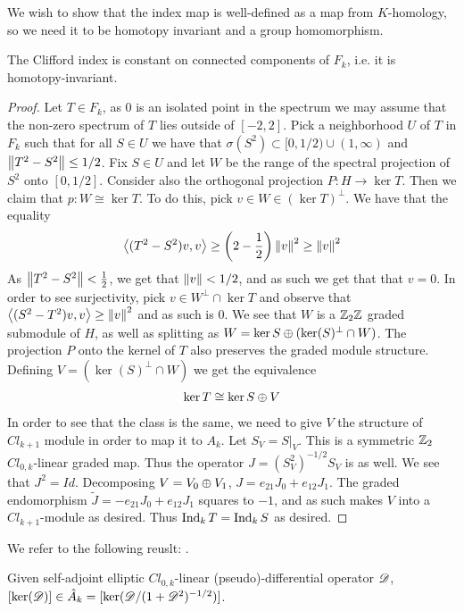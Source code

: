 We wish to show that the index map is well-defined as a map from $K$-homology, so we need it to be homotopy invariant and a group homomorphism. 
\begin{theorem}\label{welldef}
	The Clifford index is constant on connected components of $F_k$, i.e. it is homotopy-invariant. 
\end{theorem}
\begin{proof}
	Let $T\in F_k$, as $0$ is an isolated point in the spectrum we may assume that the non-zero spectrum of $T$ lies outside of $[-2,2]$. Pick a neighborhood $U$ of $T$ in $F_k$ such that for all $S\in U$ we have that $\sigma(S^2)\subset [0,1/2)\cup (1,\infty)$ and $\left \Vert T^2-S^2 \right \Vert\leq 1/2$. Fix $S\in U$ and let $W$ be the range of the spectral projection of $S^2$ onto $[0,1/2]$. 
	Consider also the orthogonal projection $P:H\to \ker T$. Then we claim that $p:W\cong \ker T$. To do this, pick $v\in W\in (\ker T)^\perp$. We have that the equality 
	\begin{align*}
		\left \langle (T^2-S^2)v,v \right \rangle\geq \left ( 2-\frac{1}{2} \right )\left \Vert v \right \Vert^2\geq \left \Vert v \right \Vert^2
	\end{align*}
	As $\left \Vert T^2-S^2 \right \Vert<\frac{1}{2}$, we get that $\left \Vert v \right \Vert<1/2$, and as such we get that that $v=0$. In order to see surjectivity, pick $v\in W^\perp \cap \ker T$ and observe that $\left \langle (S^2-T^2)v,v \right \rangle\geq \left \Vert v \right \Vert^2$ and as such is 0. 
	We see that $W$ is a $\mathbb{Z}_2\mathbb{Z}$ graded submodule of $H$, as well as splitting as $W=\ker S\oplus (\ker (S)^\perp \cap W)$. The projection $P$ onto the kernel of $T$ also preserves the graded module structure. Defining $V=(\ker (S)^\perp \cap W)$ we get the equivalence
	\begin{align*}
		\ker T\cong \ker S\oplus V
	\end{align*}
	In order to see that the class is the same, we need to give $V$ the structure of $Cl_{k+1}$ module in order to map it to $A_k$.
	Let $S_V=S|_V$. This is a symmetric $\mathbb{Z}_2$ $Cl_{0,k}$-linear graded map. Thus the operator $J=(S^2_V)^{-1/2}S_V$ is as well. We see that $J^2=Id$. Decomposing $V=V_0\oplus V_1$, $J=e_{21}J_0+e_{12}J_1$. The graded endomorphism $\tilde{J}=-e_{21}J_0+e_{12}J_1$ squares to $-1$, and as such makes $V$ into a $Cl_{k+1}$-module as desired. Thus $\operatorname{Ind}_k T=\operatorname{Ind}_k S$ as desired. 
\end{proof}
We refer to the following reuslt: \cite[Page 217]{spingeom}.
\begin{proposition}\label{unboundkernel}
	Given self-adjoint elliptic $Cl_{0,k}$-linear (pseudo)-differential operator $\mathscr{D}$, $[\ker(\mathscr{D})]\in \hat{A}_k=[\ker(\mathscr{D}/(1+\mathscr{D}^2)^{-1/2})]$.
\end{proposition}
